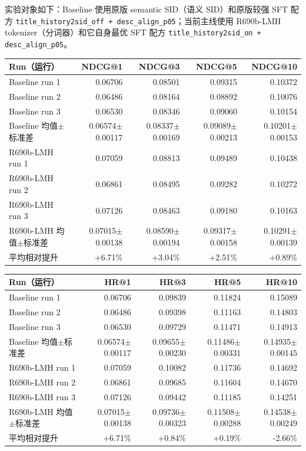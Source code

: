 \documentclass[11pt]{article}
\begin{document}
实验对象如下：Baseline 使用原版 semantic SID（语义 SID）和原版较强 SFT 配方 \texttt{title\_history2sid\_off + desc\_align\_p05}；当前主线使用 R690b-LMH tokenizer（分词器）和它自身最优 SFT 配方 \texttt{title\_history2sid\_on + desc\_align\_p05}。

\begin{center}
\small
\begin{tabular}{lrrrr}
\toprule
Run（运行） & NDCG@1 & NDCG@3 & NDCG@5 & NDCG@10 \\
\midrule
Baseline run 1 & 0.06706 & 0.08501 & 0.09315 & 0.10372 \\
Baseline run 2 & 0.06486 & 0.08164 & 0.08892 & 0.10076 \\
Baseline run 3 & 0.06530 & 0.08346 & 0.09060 & 0.10154 \\
Baseline 均值$\pm$标准差 & 0.06574$\pm$0.00117 & 0.08337$\pm$0.00169 & 0.09089$\pm$0.00213 & 0.10201$\pm$0.00153 \\
\midrule
R690b-LMH run 1 & 0.07059 & 0.08813 & 0.09489 & 0.10438 \\
R690b-LMH run 2 & 0.06861 & 0.08495 & 0.09282 & 0.10272 \\
R690b-LMH run 3 & 0.07126 & 0.08463 & 0.09180 & 0.10163 \\
R690b-LMH 均值$\pm$标准差 & 0.07015$\pm$0.00138 & 0.08590$\pm$0.00194 & 0.09317$\pm$0.00158 & 0.10291$\pm$0.00139 \\
\midrule
平均相对提升 & +6.71\% & +3.04\% & +2.51\% & +0.89\% \\
\bottomrule
\end{tabular}
\end{center}

\begin{center}
\small
\begin{tabular}{lrrrr}
\toprule
Run（运行） & HR@1 & HR@3 & HR@5 & HR@10 \\
\midrule
Baseline run 1 & 0.06706 & 0.09839 & 0.11824 & 0.15089 \\
Baseline run 2 & 0.06486 & 0.09398 & 0.11163 & 0.14803 \\
Baseline run 3 & 0.06530 & 0.09729 & 0.11471 & 0.14913 \\
Baseline 均值$\pm$标准差 & 0.06574$\pm$0.00117 & 0.09655$\pm$0.00230 & 0.11486$\pm$0.00331 & 0.14935$\pm$0.00145 \\
\midrule
R690b-LMH run 1 & 0.07059 & 0.10082 & 0.11736 & 0.14692 \\
R690b-LMH run 2 & 0.06861 & 0.09685 & 0.11604 & 0.14670 \\
R690b-LMH run 3 & 0.07126 & 0.09442 & 0.11185 & 0.14251 \\
R690b-LMH 均值$\pm$标准差 & 0.07015$\pm$0.00138 & 0.09736$\pm$0.00323 & 0.11508$\pm$0.00288 & 0.14538$\pm$0.00249 \\
\midrule
平均相对提升 & +6.71\% & +0.84\% & +0.19\% & -2.66\% \\
\bottomrule
\end{tabular}
\end{center}
\end{document}
